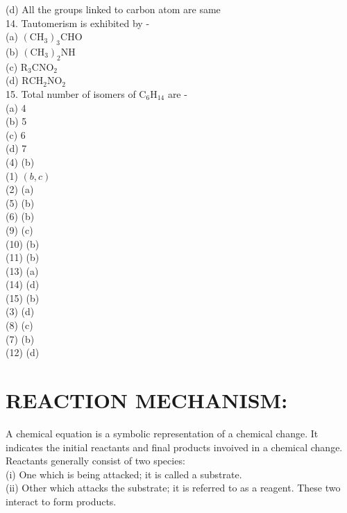 \documentclass[10pt]{article}
\begin{document}
(d) All the groups linked to carbon atom are same\\
14. Tautomerism is exhibited by -\\
(a) $\left(\mathrm{CH}_{3}\right)_{3} \mathrm{CHO}$\\
(b) $\left(\mathrm{CH}_{3}\right)_{2} \mathrm{NH}$\\
(c) $\mathrm{R}_{3} \mathrm{CNO}_{2}$\\
(d) $\mathrm{RCH}_{2} \mathrm{NO}_{2}$\\
15. Total number of isomers of $\mathrm{C}_{6} \mathrm{H}_{14}$ are -\\
(a) 4\\
(b) 5\\
(c) 6\\
(d) 7\\
(4) (b)\\
(1) $(b, c)$\\
(2) (a)\\
(5) (b)\\
(6) (b)\\
(9) (c)\\
(10) (b)\\
(11) (b)\\
(13) (a)\\
(14) (d)\\
(15) (b)\\
(3) (d)\\
(8) (c)\\
(7) (b)\\
(12) (d)

\section*{REACTION MECHANISM:}
A chemical equation is a symbolic representation of a chemical change. It indicates the initial reactants and final products invoived in a chemical change. Reactants generally consist of two species:\\
(i) One which is being attacked; it is called a substrate.\\
(ii) Other which attacks the substrate; it is referred to as a reagent. These two interact to form products.
\end{document}
